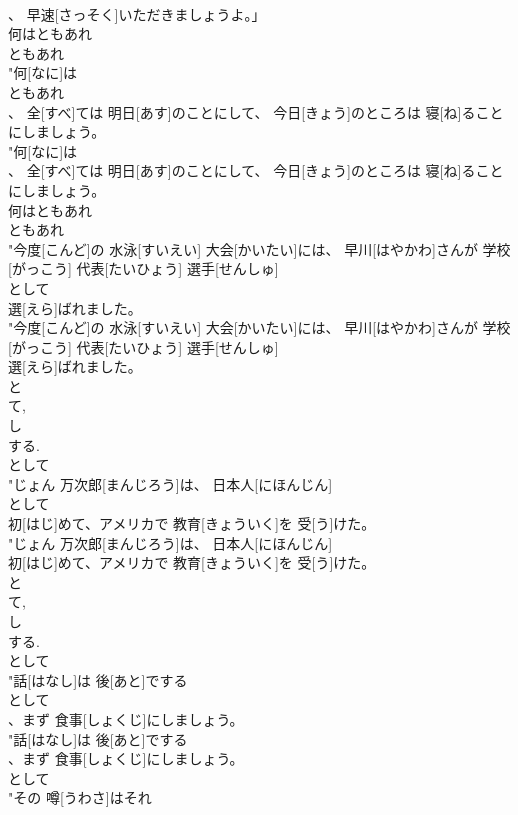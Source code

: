 \documentclass[8pt]{extreport}
\begin{document}
\begin{CJK}{UTF8}{min}
\\	、 早速[さっそく]いただきましょうよ。」
\\	何はともあれ	
\\	ともあれ
\\	"何[なに]は
\\	ともあれ
\\	、 全[すべ]ては 明日[あす]のことにして、 今日[きょう]のところは 寝[ね]ることにしましょう。
\\	"何[なに]は
\\	、 全[すべ]ては 明日[あす]のことにして、 今日[きょう]のところは 寝[ね]ることにしましょう。
\\	何はともあれ	
\\	ともあれ
\\	"今度[こんど]の 水泳[すいえい] 大会[かいたい]には、 早川[はやかわ]さんが 学校[がっこう] 代表[たいひょう] 選手[せんしゅ]
\\	として
\\	選[えら]ばれました。
\\	"今度[こんど]の 水泳[すいえい] 大会[かいたい]には、 早川[はやかわ]さんが 学校[がっこう] 代表[たいひょう] 選手[せんしゅ]
\\	選[えら]ばれました。
\\	と 
\\	て, 
\\	し 
\\	する. 
\\	として
\\	"じょん 万次郎[まんじろう]は、 日本人[にほんじん]
\\	として
\\	初[はじ]めて、アメリカで 教育[きょういく]を 受[う]けた。
\\	"じょん 万次郎[まんじろう]は、 日本人[にほんじん]
\\	初[はじ]めて、アメリカで 教育[きょういく]を 受[う]けた。
\\	と 
\\	て, 
\\	し 
\\	する. 
\\	として
\\	"話[はなし]は 後[あと]でする
\\	として
\\	、まず 食事[しょくじ]にしましょう。
\\	"話[はなし]は 後[あと]でする
\\	、まず 食事[しょくじ]にしましょう。
\\	として
\\	"その 噂[うわさ]はそれ

\end{CJK}
\end{document}
